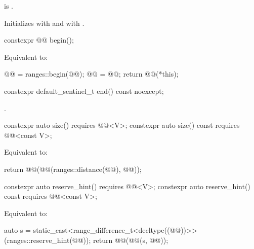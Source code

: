 \begin{itemdescr}
\pnum
\expects
{} is .

\pnum
\effects
Initializes  with  and
 with .
\end{itemdescr}

%
\begin{itemdecl}
constexpr @@ begin();
\end{itemdecl}

\begin{itemdescr}
\pnum
\effects
Equivalent to:
\begin{codeblock}
@@ = ranges::begin(@@);
@@ = @@;
return @@(*this);
\end{codeblock}
\end{itemdescr}

%
\begin{itemdecl}
constexpr default_sentinel_t end() const noexcept;
\end{itemdecl}

\begin{itemdescr}
\pnum
\returns
{}.
\end{itemdescr}

%
\begin{itemdecl}
constexpr auto size() requires @@<V>;
constexpr auto size() const requires @@<const V>;
\end{itemdecl}

\begin{itemdescr}
\pnum
\effects
Equivalent to:
\begin{codeblock}
return @@(@@(ranges::distance(@@), @@));
\end{codeblock}
\end{itemdescr}

%
\begin{itemdecl}
constexpr auto reserve_hint() requires @@<V>;
constexpr auto reserve_hint() const requires @@<const V>;
\end{itemdecl}

\begin{itemdescr}
\pnum
\effects
Equivalent to:
\begin{codeblock}
auto s = static_cast<range_difference_t<decltype((@@))>>(ranges::reserve_hint(@@));
return @@(@@(s, @@));
\end{codeblock}
\end{itemdescr}

